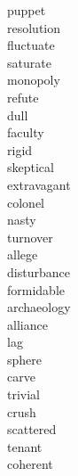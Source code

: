 \documentclass[b5paper, 11pt]{ctexart}
\begin{document}
\begin{multicols*}{3}
\begin{description}
\item[puppet]

\item[resolution]

\item[fluctuate]

\item[saturate]

\item[monopoly]

\item[refute]

\item[dull]

\item[faculty]

\item[rigid]

\item[skeptical]

\item[extravagant]

\item[colonel]

\item[nasty]

\item[turnover]

\item[allege]

\item[disturbance]

\item[formidable]

\item[archaeology]

\item[alliance]

\item[lag]

\item[sphere]

\item[carve]

\item[trivial]

\item[crush]

\item[scattered]

\item[tenant]

\item[coherent]


\end{description}
\end{multicols*}
\end{document}
